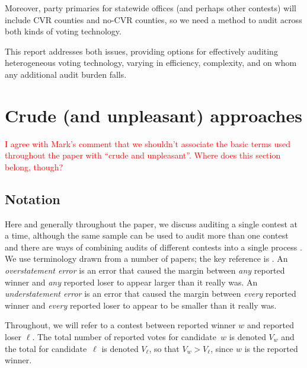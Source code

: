 \documentclass[12pt]{article}
\newcommand{\note}[1]{\textcolor{red}{\sc #1}}
\begin{document}
Moreover, party primaries for statewide offices (and perhaps other contests) will
include CVR counties and no-CVR counties, so we need a method to audit
across both kinds of voting technology. 

This report addresses both issues, providing options for effectively auditing heterogeneous 
voting technology, varying in efficiency, complexity, and on whom any additional audit burden falls.

\section{Crude (and unpleasant) approaches} \label{sec:crude}

\note{I agree with Mark's comment that we shouldn't associate the basic terms used throughout the paper with ``crude and unpleasant''.
Where does this section belong, though?}
\subsection{Notation}
Here and generally throughout the paper, we 
discuss auditing a single contest at a time, although the same sample can be used to audit
more than one contest and there are ways of combining audits of different contests into
a single process \citep{stark09c,stark10d}.
We use terminology drawn from a number of papers; the key reference is \citet{lindemanStark12}.
An \emph{overstatement error} is an error that caused the margin between \emph{any} reported
winner and \emph{any} reported loser to appear larger than it really was.
An \emph{understatement error} is an error that caused the margin between \emph{every} reported
winner and \emph{every} reported loser to appear to be smaller than it really was.

Throughout, we will refer to a contest between reported winner $w$ and reported loser $\ell$.
The total number of reported votes for candidate~$w$ is denoted $V_w$ 
and the total for candidate~$\ell$ is denoted $V_\ell$, so that $V_w > V_\ell$, since 
$w$ is the reported winner.
\end{document}
